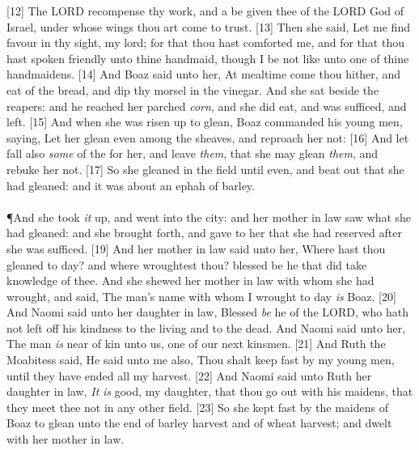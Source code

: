 [12] \textcolor[cmyk]{0.99998,1,0,0}{The LORD recompense thy work, and a  be given thee of the LORD God of Israel, under whose wings thou art come to trust.}
[13] \textcolor[cmyk]{0.99998,1,0,0}{Then she said, Let me find favour in thy sight, my lord; for that thou hast comforted me, and for that thou hast spoken friendly unto thine handmaid, though I be not like unto one of thine handmaidens.}
[14] \textcolor[cmyk]{0.99998,1,0,0}{And Boaz said unto her, At mealtime come thou hither, and eat of the bread, and dip thy morsel in the vinegar. And she sat beside the reapers: and he reached her parched \emph{corn}, and she did eat, and was sufficed, and left.}
[15] \textcolor[cmyk]{0.99998,1,0,0}{And when she was risen up to glean, Boaz commanded his young men, saying, Let her glean even among the sheaves, and reproach her not:}
[16] \textcolor[cmyk]{0.99998,1,0,0}{And let fall also \emph{some} of the  for her, and leave \emph{them}, that she may glean \emph{them}, and rebuke her not.}
[17] \textcolor[cmyk]{0.99998,1,0,0}{So she gleaned in the field until even, and beat out that she had gleaned: and it was about an ephah of barley.}\\
\\
\P \textcolor[cmyk]{0.99998,1,0,0}{And she took \emph{it} up, and went into the city: and her mother in law saw what she had gleaned: and she brought forth, and gave to her that she had reserved after she was sufficed.}
[19] \textcolor[cmyk]{0.99998,1,0,0}{And her mother in law said unto her, Where hast thou gleaned to day? and where wroughtest thou? blessed be he that did take knowledge of thee. And she shewed her mother in law with whom she had wrought, and said, The man's name with whom I wrought to day \emph{is} Boaz.}
[20] \textcolor[cmyk]{0.99998,1,0,0}{And Naomi said unto her daughter in law, Blessed \emph{be} he of the LORD, who hath not left off his kindness to the living and to the dead. And Naomi said unto her, The man \emph{is} near of kin unto us, one of our next kinsmen.}
[21] \textcolor[cmyk]{0.99998,1,0,0}{And Ruth the Moabitess said, He said unto me also, Thou shalt keep fast by my young men, until they have ended all my harvest.}
[22] \textcolor[cmyk]{0.99998,1,0,0}{And Naomi said unto Ruth her daughter in law, \emph{It} \emph{is} good, my daughter, that thou go out with his maidens, that they meet thee not in any other field.}
[23] \textcolor[cmyk]{0.99998,1,0,0}{So she kept fast by the maidens of Boaz to glean unto the end of barley harvest and of wheat harvest; and dwelt with her mother in law.}
